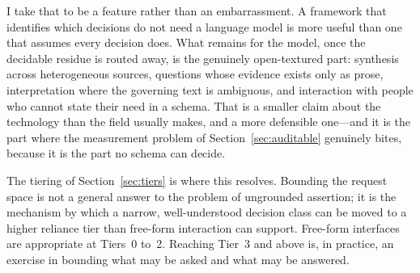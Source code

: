 I take that to be a feature rather than an embarrassment. A framework that identifies
which decisions do not need a language model is more useful than one that assumes every
decision does. What remains for the model, once the decidable residue is routed away, is
the genuinely open-textured part: synthesis across heterogeneous sources, questions whose
evidence exists only as prose, interpretation where the governing text is ambiguous, and
interaction with people who cannot state their need in a schema. That is a smaller claim
about the technology than the field usually makes, and a more defensible one---and it is
the part where the measurement problem of Section~\ref{sec:auditable} genuinely bites,
because it is the part no schema can decide.

The tiering of Section~\ref{sec:tiers} is where this resolves. Bounding the request
space is not a general answer to the problem of ungrounded assertion; it is the
mechanism by which a narrow, well-understood decision class can be moved to a higher
reliance tier than free-form interaction can support. Free-form interfaces are
appropriate at Tiers~0 to~2. Reaching Tier~3 and above is, in practice, an exercise in
bounding what may be asked and what may be answered.
